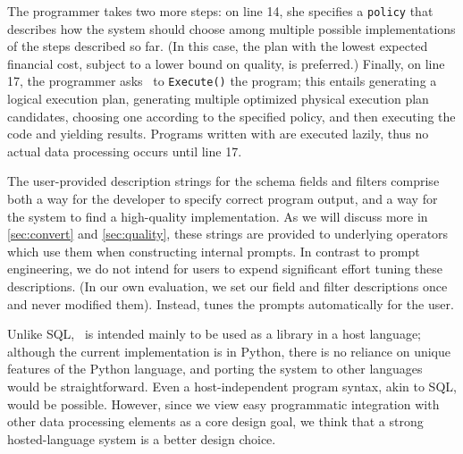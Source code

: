 The programmer takes two more steps: on line 14, she specifies a {\tt policy} that describes how the system should choose among multiple possible implementations of the steps described so far. (In this case, the plan with the lowest expected financial cost, subject to a lower bound on quality, is preferred.) Finally, on line 17, the programmer asks \system\ to {\tt Execute()} the program; this entails generating a logical execution plan, generating multiple optimized physical execution plan candidates, choosing one according to the specified policy, and then executing the code and yielding results. Programs written with \system{} are executed lazily, thus no actual data processing occurs until line 17.

The user-provided description strings for the schema fields and filters comprise both a way for the developer to specify correct program output, and a way for the system to find a high-quality implementation. As we will discuss more in \autoref{sec:convert} and \autoref{sec:quality}, these strings are provided to underlying operators which use them when constructing internal prompts. In contrast to prompt engineering, we do not intend for users to expend significant effort tuning these descriptions. (In our own evaluation, we set our field and filter descriptions once and never modified them). Instead, \system{} tunes the prompts automatically for the user.


Unlike SQL, \system\ is intended mainly to be used as a library in a host language; although the current implementation is in Python, there is no reliance on unique features of the Python language,
and porting the system to other languages would be straightforward. Even a host-independent program syntax, akin to SQL, would be possible. However, since we view easy programmatic integration with other data processing elements as a core design goal, we think that a strong hosted-language system is a better design choice.

